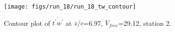 \begin{figure}[H]
\centering
\texttt{[image: figs/run\_18/run\_18\_tw\_contour]}
\caption{Contour plot of $\overline{t^\prime w^\prime}$ at $z/c$=6.97, $V_{free}$=29.12, station 2.}
\label{fig:run_18_tw_contour}
\end{figure}


